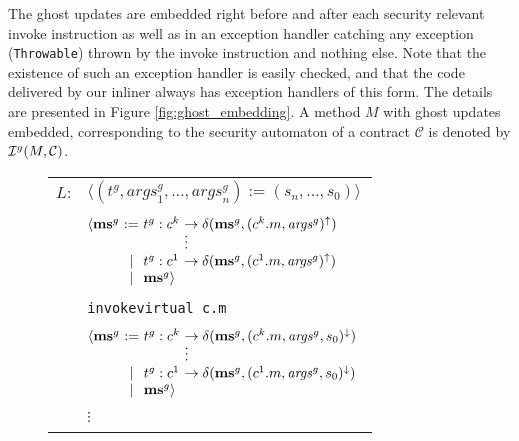 \documentclass[10pt,twocolumn]{article}
\newcommand{\ghost}[1]{{\it #1}^g}
\newcommand{\MS}{{\bf ms}}
\newcommand{\Contract}{\mathcal{C}}
\newcommand{\Inline}{{\cal I}}
\newcommand{\GI}{\ghost{\Inline}}
\begin{document}
The ghost updates are embedded right before and after each security 
relevant invoke instruction as well as in an exception handler catching 
any exception ({\tt Throwable}) thrown by the invoke instruction and 
nothing else. Note that the existence of such an exception handler is 
easily checked, and that the code delivered 
by our inliner always has exception handlers of this form. The details are 
presented in Figure \ref{fig:ghost_embedding}. A method $M$ with ghost 
updates embedded, corresponding to the security automaton of a 
contract $\Contract$ is denoted by $\GI(M, \Contract)$.
\begin{figure}
\centering
\begin{tabular}{@{}r@{~}l@{}}
$L$: & $\langle (t^g, \mathit{args}^g_1, \ldots, \mathit{args}^g_n) := (s_n, \ldots, s_0)\rangle $ \\
   & \\[-3mm]
   & $\begin{array}[t]{@{}l@{~}c@{~}l@{~}l}
         \langle \MS^g &:=& t^g : c^k & \rightarrow \delta(\MS^g, (c^k.m, \mathit{args}^g)^\uparrow) \\[-1.5mm]
                       &  &           & \vdots \\
                       &| & t^g : c^1 & \rightarrow \delta(\MS^g, (c^1.m, \mathit{args}^g)^\uparrow) \\
                       &| & \MS^g\rangle & \\
         \end{array}$ \\
   & \\[-3mm]
   & {\tt invokevirtual~c.m} \\
   & \\[-3mm]
   & $\begin{array}[t]{@{}l@{~}c@{~}l@{~}l}
         \langle \MS^g &:=& t^g : c^k & \rightarrow \delta(\MS^g, (c^k.m, \mathit{args}^g, s_0)^\downarrow) \\[-1.5mm]
                       &  &           & \vdots \\
                       &| & t^g : c^1 & \rightarrow \delta(\MS^g, (c^1.m, \mathit{args}^g, s_0)^\downarrow) \\
                       &| & \MS^g \rangle & \\
         \end{array}$\\ 
   &\\[-3mm]
   &$\vdots$ \\
   &\\[-3mm]

\end{tabular}
\end{figure}
\end{document}
